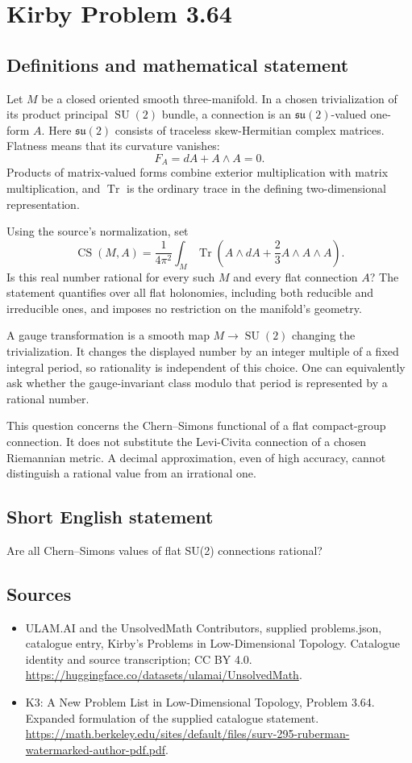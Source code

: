 \documentclass[11pt,a4paper]{article}
\begin{document}
\section*{Kirby Problem 3.64}\label{statement}

\subsection{Definitions and mathematical statement}
Let $M$ be a closed oriented smooth three-manifold. In a chosen trivialization of its product principal $\operatorname{SU}(2)$ bundle, a connection is an $\mathfrak{su}(2)$-valued one-form $A$. Here $\mathfrak{su}(2)$ consists of traceless skew-Hermitian complex matrices. Flatness means that its curvature vanishes:
\[
F_A=dA+A\wedge A=0.
\]
Products of matrix-valued forms combine exterior multiplication with matrix multiplication, and $\operatorname{Tr}$ is the ordinary trace in the defining two-dimensional representation.

Using the source's normalization, set
\[
\operatorname{CS}(M,A)=\frac1{4\pi^2}
\int_M\operatorname{Tr}\left(A\wedge dA+\frac23A\wedge A\wedge A\right).
\]
Is this real number rational for every such $M$ and every flat connection $A$? The statement quantifies over all flat holonomies, including both reducible and irreducible ones, and imposes no restriction on the manifold's geometry.

A gauge transformation is a smooth map $M\to\operatorname{SU}(2)$ changing the trivialization. It changes the displayed number by an integer multiple of a fixed integral period, so rationality is independent of this choice. One can equivalently ask whether the gauge-invariant class modulo that period is represented by a rational number.

This question concerns the Chern--Simons functional of a flat compact-group connection. It does not substitute the Levi-Civita connection of a chosen Riemannian metric. A decimal approximation, even of high accuracy, cannot distinguish a rational value from an irrational one.
\subsection{Short English statement}
Are all Chern--Simons values of flat SU(2) connections rational?
\subsection{Sources}
\begin{itemize}
\item[S1] ULAM.AI and the UnsolvedMath Contributors, supplied problems.json, catalogue entry, Kirby's Problems in Low-Dimensional Topology. Catalogue identity and source transcription; CC BY 4.0.
\url{https://huggingface.co/datasets/ulamai/UnsolvedMath}.
\item[S2] K3: A New Problem List in Low-Dimensional Topology, Problem 3.64. Expanded formulation of the supplied catalogue statement.
\url{https://math.berkeley.edu/sites/default/files/surv-295-ruberman-watermarked-author-pdf.pdf}.
\end{itemize}
\end{document}
